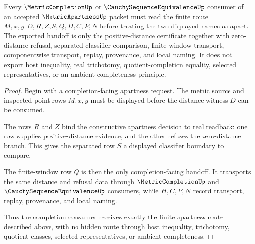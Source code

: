 \begin{theorem}
\label{thm:metric-apartness-completion-handoff}
Every $\MetricCompletionUp$ or $\CauchySequenceEquivalenceUp$ consumer of an accepted $\MetricApartnessUp$ packet must read the finite route $M,x,y,D,R,Z,S,Q,H,C,P,N$ before treating the two displayed names as apart. The exported handoff is only the positive-distance certificate together with zero-distance refusal, separated-classifier comparison, finite-window transport, componentwise transport, replay, provenance, and local naming. It does not export host inequality, real trichotomy, quotient-completion equality, selected representatives, or an ambient completeness principle.
\end{theorem}
\begin{proof}
Begin with a completion-facing apartness request. The metric source and inspected point rows $M,x,y$ must be displayed before the distance witness $D$ can be consumed.

The rows $R$ and $Z$ bind the constructive apartness decision to real readback: one row supplies positive-distance evidence, and the other refuses the zero-distance branch. This gives the separated row $S$ a displayed classifier boundary to compare.

The finite-window row $Q$ is then the only completion-facing handoff. It transports the same distance and refusal data through $\MetricCompletionUp$ and $\CauchySequenceEquivalenceUp$ consumers, while $H,C,P,N$ record transport, replay, provenance, and local naming.

Thus the completion consumer receives exactly the finite apartness route described above, with no hidden route through host inequality, trichotomy, quotient classes, selected representatives, or ambient completeness.
\end{proof}



